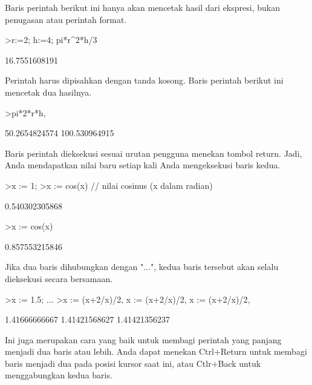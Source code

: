 \documentclass[a4paper,10pt]{article}
\begin{document}
\begin{eulernotebook}
\begin{eulercomment}
Baris perintah berikut ini hanya akan mencetak hasil dari ekspresi,
bukan penugasan atau perintah format.
\end{eulercomment}
\begin{eulerprompt}
>r:=2; h:=4; pi*r^2*h/3
\end{eulerprompt}
\begin{euleroutput}
  16.7551608191
\end{euleroutput}
\begin{eulercomment}
Perintah harus dipisahkan dengan tanda kosong. Baris perintah berikut
ini mencetak dua hasilnya.
\end{eulercomment}
\begin{eulerprompt}
>pi*2*r*h, %
\end{eulerprompt}
\begin{euleroutput}
  50.2654824574
  100.530964915
\end{euleroutput}
\begin{eulercomment}
Baris perintah dieksekusi sesuai urutan pengguna menekan tombol
return. Jadi, Anda mendapatkan nilai baru setiap kali Anda
mengeksekusi baris kedua.
\end{eulercomment}
\begin{eulerprompt}
>x := 1;
>x := cos(x) // nilai cosinus (x dalam radian)
\end{eulerprompt}
\begin{euleroutput}
  0.540302305868
\end{euleroutput}
\begin{eulerprompt}
>x := cos(x)
\end{eulerprompt}
\begin{euleroutput}
  0.857553215846
\end{euleroutput}
\begin{eulercomment}
Jika dua baris dihubungkan dengan "...", kedua baris tersebut akan
selalu dieksekusi secara bersamaan.
\end{eulercomment}
\begin{eulerprompt}
>x := 1.5; ...
>x := (x+2/x)/2, x := (x+2/x)/2, x := (x+2/x)/2, 
\end{eulerprompt}
\begin{euleroutput}
  1.41666666667
  1.41421568627
  1.41421356237
\end{euleroutput}
\begin{eulercomment}
Ini juga merupakan cara yang baik untuk membagi perintah yang panjang
menjadi dua baris atau lebih. Anda dapat menekan Ctrl+Return untuk
membagi baris menjadi dua pada posisi kursor saat ini, atau Ctlr+Back
untuk menggabungkan kedua baris.


\end{eulercomment}
\end{eulernotebook}
\end{document}
